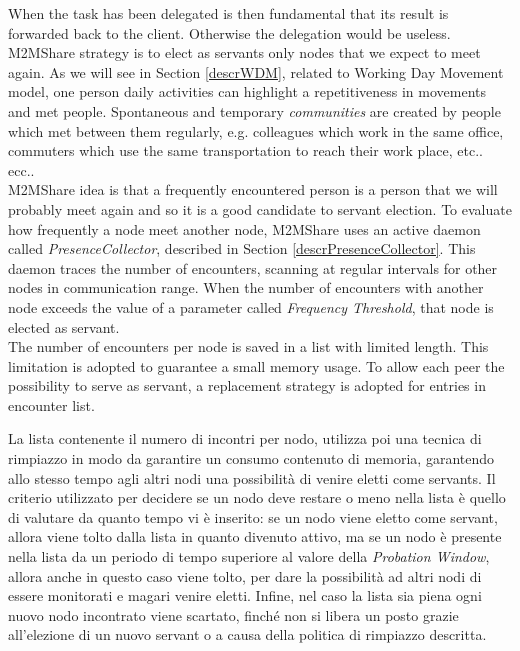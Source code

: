 When the task has been delegated is then fundamental that its result is forwarded back to the client. Otherwise the delegation would be useless. M2MShare strategy is to elect as servants only nodes that we expect to meet again. As we will see in Section \ref{descrWDM}, related to Working Day Movement model, one person daily activities can highlight a repetitiveness in movements and met people. Spontaneous and temporary \textit{communities} are created by people which met between them regularly, e.g. colleagues which work in the same office, commuters which use the same transportation to reach their work place, etc.. ecc..
\\

M2MShare idea is that a frequently encountered person is a person that we will probably meet again and so it is a good candidate to servant election. To evaluate how frequently a node meet another node, M2MShare uses an active daemon called \textit{PresenceCollector}, described in Section \ref{descrPresenceCollector}. This daemon traces the number of encounters, scanning at regular intervals for other nodes in communication range. When the number of encounters with another node exceeds the value of a parameter called \textit{Frequency Threshold}, that node is elected as servant.
\\

The number of encounters per node is saved in a list with limited length. This limitation is adopted to guarantee a small memory usage. To allow each peer the possibility to serve as servant, a replacement strategy is adopted for entries in encounter list. 

La lista contenente il numero di incontri per nodo, utilizza poi una tecnica di rimpiazzo in modo da garantire un consumo contenuto di memoria, garantendo allo stesso tempo agli altri nodi una possibilità di venire eletti come servants. Il criterio utilizzato per decidere se un nodo deve restare o meno nella lista è quello di valutare da quanto tempo vi è inserito: se un nodo viene eletto come servant, allora viene tolto dalla lista in quanto divenuto attivo, ma se un nodo è presente nella lista da un periodo di tempo superiore al valore della \textit{Probation Window}, allora anche in questo caso viene tolto, per dare la possibilità ad altri nodi di essere monitorati e magari venire eletti. Infine, nel caso la lista sia piena ogni nuovo nodo incontrato viene scartato, finché non si libera un posto grazie all'elezione di un nuovo servant o a causa della politica di rimpiazzo descritta.

